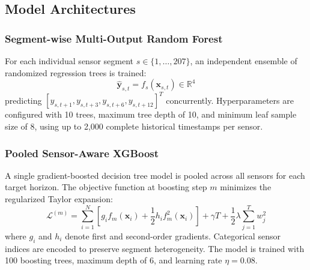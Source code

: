 \documentclass[conference]{IEEEtran}
\begin{document}
\subsection{Model Architectures}

\subsubsection{Segment-wise Multi-Output Random Forest}
For each individual sensor segment $s \in \{1, \dots, 207\}$, an independent ensemble of randomized regression trees is trained:
\begin{equation}
\hat{\mathbf{y}}_{s,t} = f_s(\mathbf{x}_{s,t}) \in \mathbb{R}^4
\end{equation}
predicting $[y_{s,t+1}, y_{s,t+3}, y_{s,t+6}, y_{s,t+12}]^T$ concurrently. Hyperparameters are configured with 10 trees, maximum tree depth of 10, and minimum leaf sample size of 8, using up to 2,000 complete historical timestamps per sensor.

\subsubsection{Pooled Sensor-Aware XGBoost}
A single gradient-boosted decision tree model is pooled across all sensors for each target horizon. The objective function at boosting step $m$ minimizes the regularized Taylor expansion:
\begin{equation}
\mathcal{L}^{(m)} = \sum_{i=1}^N \left[ g_i f_m(\mathbf{x}_i) + \frac{1}{2} h_i f_m^2(\mathbf{x}_i) \right] + \gamma T + \frac{1}{2} \lambda \sum_{j=1}^T w_j^2
\end{equation}
where $g_i$ and $h_i$ denote first and second-order gradients. Categorical sensor indices are encoded to preserve segment heterogeneity. The model is trained with 100 boosting trees, maximum depth of 6, and learning rate $\eta = 0.08$.
\end{document}

